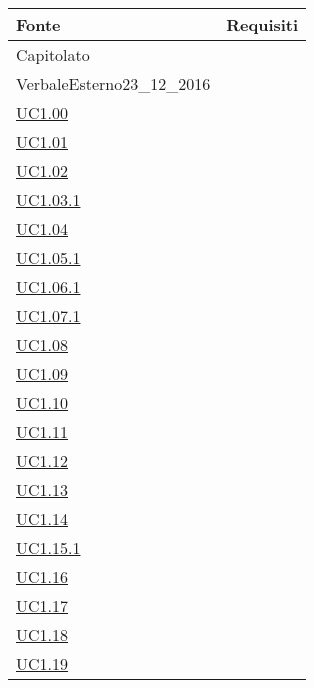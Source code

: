 \begin{longtable}{|P{6cm}|P{6cm}|}
	\hline \textbf{Fonte} & \textbf{Requisiti}\\
	\hline Capitolato &  \linebreak {} \linebreak {} \linebreak {} \linebreak {} \\
	\hline VerbaleEsterno23\_12\_2016 &  \linebreak {} \\
	\hline \hyperref[UC1.00]{UC1.00} &  \\
	\hline \hyperref[UC1.01]{UC1.01} &  \\
	\hline \hyperref[UC1.02]{UC1.02} &  \\
	\hline \hyperref[UC1.03.1]{UC1.03.1} &  \\
	\hline \hyperref[UC1.04]{UC1.04} &  \\
	\hline \hyperref[UC1.05.1]{UC1.05.1} &  \\
	\hline \hyperref[UC1.06.1]{UC1.06.1} &  \\
	\hline \hyperref[UC1.07.1]{UC1.07.1} &  \\
	\hline \hyperref[UC1.08]{UC1.08} &  \\
	\hline \hyperref[UC1.09]{UC1.09} &  \\
	\hline \hyperref[UC1.10]{UC1.10} &  \\
	\hline \hyperref[UC1.11]{UC1.11} &  \\	
	\hline \hyperref[UC1.12]{UC1.12} &  \\
	\hline \hyperref[UC1.13]{UC1.13} &  \\	
	\hline \hyperref[UC1.14]{UC1.14} &  \\
	\hline \hyperref[UC1.15.1]{UC1.15.1} &  \\
	\hline \hyperref[UC1.16]{UC1.16} &  \\
	\hline \hyperref[UC1.17]{UC1.17} &  \\
	\hline \hyperref[UC1.18]{UC1.18} &  \\
	\hline \hyperref[UC1.19]{UC1.19} &  \\

\end{longtable}
